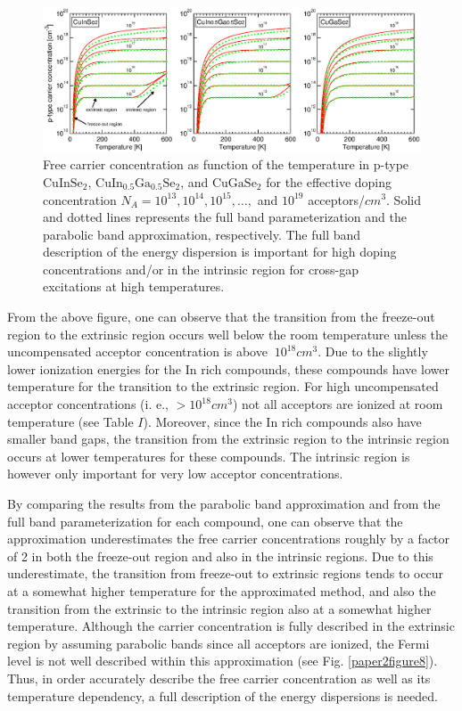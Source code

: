 \documentclass[a4paper, 12pt, titlepage,oneside,drop]{kthesis}
\begin{document}
\begin{figure}[H]
\begin{center}
\includegraphics[scale=.6]{paper2figure9.eps}
\end{center}
\caption{ Free carrier concentration as function of the temperature in p-type $\mathrm {CuInSe_2}$, $\mathrm {CuIn_{0.5}Ga_{0.5}Se_2}$, and $\mathrm {CuGaSe_2}$ for the effective doping concentration
 $N_A = 10^{13}, 10^{14}, 10^{15}, …,$ and $10^{19}$ acceptors/$cm^3$. Solid and dotted lines represents the full band parameterization and the parabolic band approximation,
 respectively. The full band description of the energy dispersion is important for high doping concentrations and/or in the intrinsic region for cross-gap
 excitations at high temperatures. }
\label{paper2figure9}
\end{figure}

From the above figure, one can observe that the transition from the freeze-out region to the extrinsic region occurs well below the room temperature unless
the uncompensated acceptor concentration is above $~10^{18} cm^3$. Due to the slightly lower ionization energies for the In rich compounds, these compounds 
have lower temperature for the transition to the extrinsic region. For high uncompensated acceptor concentrations (i. e., $>10^{18} cm^3$) not all acceptors 
are ionized at room temperature (see Table $I$). Moreover, since the In rich compounds also have smaller band gaps, the transition from the extrinsic 
region to the intrinsic region occurs at lower temperatures for these compounds. The intrinsic region is however only important for very low acceptor 
concentrations. 

By comparing the results from the parabolic band approximation and from the full band parameterization for each compound, one can observe that the 
approximation underestimates the free carrier concentrations roughly by a factor of 2 in both the freeze-out region and also in the intrinsic regions.
Due to this underestimate, the transition from freeze-out to extrinsic regions tends to occur at a somewhat higher temperature for the approximated method,
and also the transition from the extrinsic to the intrinsic region also at a somewhat higher temperature. Although the carrier concentration is fully described 
in the extrinsic region by assuming parabolic bands since all acceptors are ionized, the Fermi level is not well described within this approximation (see Fig. \ref{paper2figure8}). 
Thus, in order accurately describe the free carrier concentration as well as its temperature dependency, a full description of the energy dispersions is needed. 
\end{document}
